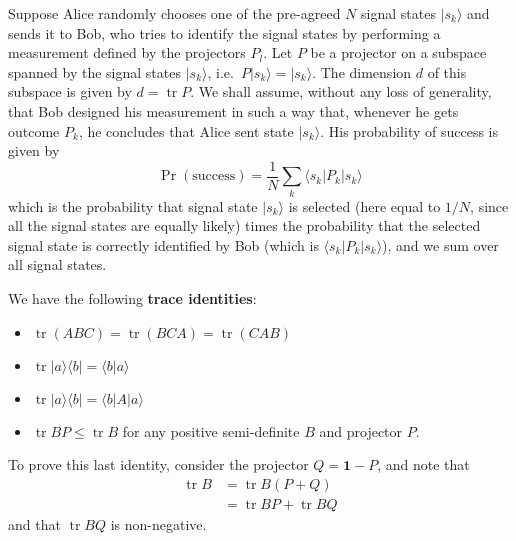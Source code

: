 \documentclass[fleqn]{article}
\providecommand{\tightlist}{%
  \setlength{\itemsep}{0pt}\setlength{\parskip}{0pt}}
\newenvironment{idea}{\noindent}{\medskip}
\begin{document}
Suppose Alice randomly chooses one of the pre-agreed \(N\) signal states \(|s_k\rangle\) and sends it to Bob, who tries to identify the signal states by performing a measurement defined by the projectors \(P_l\).
Let \(P\) be a projector on a subspace spanned by the signal states \(|s_k\rangle\), i.e.~\(P|s_k\rangle = |s_k\rangle\).
The dimension \(d\) of this subspace is given by \(d = \operatorname{tr}P\).
We shall assume, without any loss of generality, that Bob designed his measurement in such a way that, whenever he gets outcome \(P_k\), he concludes that Alice sent state \(|s_k\rangle\).
His probability of success is given by
\[
  \Pr(\text{success})
  = \frac{1}{N} \sum_k \langle s_k|P_k|s_k\rangle
\]
which is the probability that signal state \(|s_k\rangle\) is selected (here equal to \(1/N\), since all the signal states are equally likely) times the probability that the selected signal state is correctly identified by Bob (which is \(\langle s_k|P_k|s_k\rangle\)), and we sum over all signal states.

\begin{idea}
We have the following \textbf{trace identities}:

\begin{itemize}
\tightlist
\item
  \(\operatorname{tr}(ABC) = \operatorname{tr}(BCA) = \operatorname{tr}(CAB)\)
\item
  \(\operatorname{tr}|a\rangle\langle b| = \langle b|a\rangle\)
\item
  \(\operatorname{tr}|a\rangle\langle b| = \langle b|A|a\rangle\)
\item
  \(\operatorname{tr}BP \leqslant\operatorname{tr}B\) for any positive semi-definite \(B\) and projector \(P\).
\end{itemize}

To prove this last identity, consider the projector \(Q=\mathbf{1}-P\), and note that
\[
  \begin{aligned}
    \operatorname{tr}B
    &= \operatorname{tr}B(P+Q)
  \\&= \operatorname{tr}BP + \operatorname{tr}BQ
  \end{aligned}
\]
and that \(\operatorname{tr}BQ\) is non-negative.

\end{idea}
\end{document}
